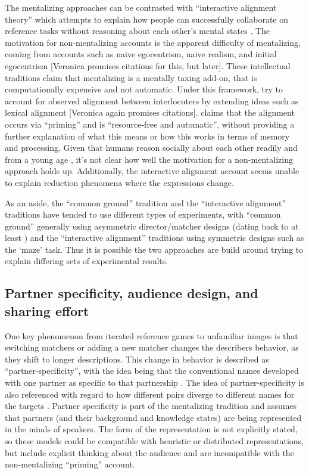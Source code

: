 \documentclass[]{article}
\begin{document}
The mentalizing approaches can be contrasted with ``interactive alignment theory'' which attempts to explain how people can successfully collaborate on reference tasks without reasoning about each other's mental states \citep{pickering2004, gandolfi2022}. The motivation for non-mentalizing accounts is the apparent difficulty of mentalizing, coming from accounts such as naive egocentrism, naive realism, and initial egocentrism [Veronica promises citations for this, but later]. %
 These intellectual traditions claim that mentalizing is a mentally taxing add-on, that is computationally expensive and not automatic. Under this framework, \citep{pickering2004, gandolfi2022} try to account for observed alignment between interlocuters by extending ideas such as lexical alignment [Veronica again promises citations].%
   \citep{pickering2004} claims that the alignment occurs via ``priming'' and is ``resource-free and automatic'', without providing a further explanation of what this means or how this works in terms of memory and processing.  Given that humans reason socially about each other readily and from a young age \citep{rakoczy2022}, it's not clear how well the motivation for a non-mentalizing approach holds up. Additionally, the interactive alignment account seems unable to explain reduction phenomena where the expressions change. 

As an aside, the ``common ground'' tradition and the ``interactive alignment'' traditions have tended to use different types of experiments, with ``common ground'' generally using asymmetric director/matcher designs (dating back to at least \citet{krauss1966}) and the ``interactive alignment'' traditions using symmetric designs such as the `maze' task. Thus it is possible the two approaches are build around trying to explain differing sets of experimental results. 




\subsection{Partner specificity, audience design, and sharing effort}

One key phenomenon from iterated reference games to unfamiliar images is that switching matchers or adding a new matcher changes the describers behavior, as they shift to longer descriptions. This change in behavior is described as ``partner-specificity'', with the idea being that the conventional names developed with one partner as specific to that partnership \citep{brennan1996, metzing2003a, hawkins2021a}. The idea of partner-specificity is also referenced with regard to how different pairs diverge to different names for the targets \citep{hawkins2020b}. Partner specificity is part of the mentalizing tradition and assumes that partners (and their background and knowledge states) are being represented in the minds of speakers. The form of the representation is not explicitly stated, so these models could be compatible with heuristic or distributed representations, but include explicit thinking about the audience and are incompatible with the non-mentalizing ``priming'' account. 
\end{document}
